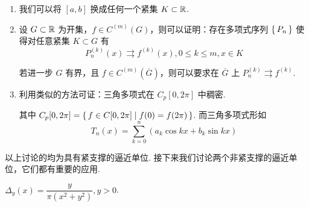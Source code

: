 \begin{hint}
    \begin{enumerate}
        \item 我们可以将 $[a,b]$ 换成任何一个紧集 $K\subset\mathbb{R}$.
        
        \item 设 $G\subset\mathbb{R}$ 为开集，$f\in C^{(m)}(G)$，则可以证明：存在多项式序列 $\set{P_n}$ 使得对任意紧集 $K\subset G$ 有
$$
P_n^{(k)}(x)\rightrightarrows f^{(k)}(x),0\le k\le m,x\in K
$$

        若进一步 $G$ 有界，且 $f\in C^{(m)}(\overline{G})$，则可以要求在 $\overline{G}$ 上 $P_n^{(k)}\rightrightarrows f^{(k)}$.

        \item 利用类似的方法可证：三角多项式在 $C_p[0,2\pi]$ 中稠密.
        
        其中 $C_p[0,2\pi]=\set{f\in C[0,2\pi]|f(0)=f(2\pi)}$. 而三角多项式形如
$$
T_n(x)=\sum_{k=0}^n(a_k\cos kx+b_k\sin kx)
$$
    \end{enumerate}
\end{hint}

以上讨论的均为具有紧支撑的逼近单位. 接下来我们讨论两个非紧支撑的逼近单位，它们都有重要的应用.

\begin{example}
    $\Delta_y(x)=\dfrac{y}{\pi(x^2+y^2)},y>0$.
\end{example}

